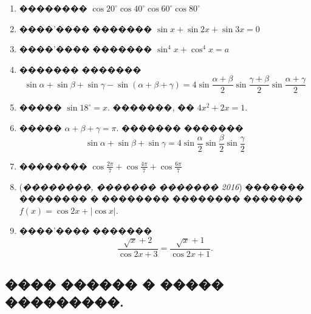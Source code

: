 \documentclass[a4paper,12pt]{article}
\begin{document}
\begin{enumerate}
\item �������� $\cos20^{\circ} \cos40^{\circ} \cos60^{\circ} \cos80^{\circ}$

\item ����'���� ������� $\sin x + \sin 2x + \sin 3x = 0$

\item ����'���� ������� $\sin^{4}x+\cos^{4}x=a$

\item ������� ������� $$\sin \alpha + \sin \beta + \sin \gamma - \sin (\alpha + \beta + \gamma) = 4\sin \frac{\alpha+\beta}{2} \sin \frac{\gamma+\beta}{2} \sin \frac{\alpha+\gamma}{2}$$


\item ����� $\sin 18^{\circ}=x$. �������, �� $4x^{2}+2x=1$.

\item ����� $\alpha+\beta+\gamma = \pi$. ������� ������� $$\sin \alpha + \sin \beta + \sin \gamma = 4\sin \frac{\alpha}{2} \sin \frac{\beta}{2} \sin \frac{\gamma}{2}$$

\item �������� $\cos\frac{2\pi}{7} + \cos\frac{4\pi}{7} + \cos\frac{6\pi}{7}$

\item (\textit{��������, ������� ������� 2016}) ������� �������� � �������� �������� ������� $f(x)=\cos 2x + |\cos x|.$

\item ����'���� ������� $$\frac{\sqrt{x}+2}{\cos 2x +3}=\frac{\sqrt{x}+1}{\cos 2x + 1}.$$

\end{enumerate}










\newpage


\begin{center}
\section*{���� ������ � ����� ���������.}
\end{center}

\medskip\medskip\medskip
\end{document}
